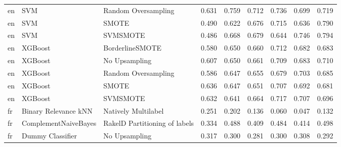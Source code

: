 \begin{tabular}{lllllllll}
      en &                             SVM &           Random Oversampling & 0.631 &                     0.759 &                 0.712 &                  0.736 &                                   0.699 &     0.719 \\
      en &                             SVM &                         SMOTE & 0.490 &                     0.622 &                 0.676 &                  0.715 &                                   0.636 &     0.790 \\
      en &                             SVM &                      SVMSMOTE & 0.486 &                     0.668 &                 0.679 &                  0.644 &                                   0.746 &     0.794 \\
      en &                         XGBoost &               BorderlineSMOTE & 0.580 &                     0.650 &                 0.660 &                  0.712 &                                   0.682 &     0.683 \\
      en &                         XGBoost &                 No Upsampling & 0.607 &                     0.650 &                 0.661 &                  0.709 &                                   0.683 &     0.710 \\
      en &                         XGBoost &           Random Oversampling & 0.586 &                     0.647 &                 0.655 &                  0.679 &                                   0.703 &     0.685 \\
      en &                         XGBoost &                         SMOTE & 0.636 &                     0.647 &                 0.651 &                  0.707 &                                   0.692 &     0.681 \\
      en &                         XGBoost &                      SVMSMOTE & 0.632 &                     0.641 &                 0.664 &                  0.717 &                                   0.707 &     0.696 \\
      fr &            Binary Relevance kNN &           Natively Multilabel & 0.251 &                     0.202 &                 0.136 &                  0.060 &                                   0.047 &     0.132 \\
      fr &            ComplementNaiveBayes & RakelD Partitioning of labels & 0.334 &                     0.488 &                 0.409 &                  0.484 &                                   0.414 &     0.498 \\
      fr &                Dummy Classifier &                 No Upsampling & 0.317 &                     0.300 &                 0.281 &                  0.300 &                                   0.308 &     0.292 \\

\end{tabular}
